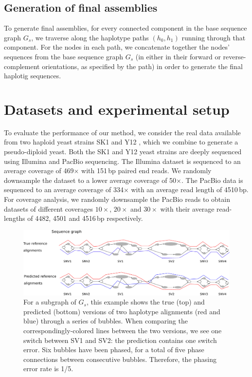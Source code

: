 \subsection{Generation of final assemblies}
To generate final assemblies, for every connected component in the base sequence graph $G_s$, we traverse along the haplotype paths $(h_0,h_1)$ running through that component. For the nodes in each path, we concatenate together the nodes' sequences from the base sequence graph $G_s$ (in either in their forward or reverse-complement orientations, as specified by the path) in order to generate the final haplotig sequences.

\section{Datasets and experimental setup}
To evaluate the performance of our method, we consider the real data available from two haploid yeast strains SK1 and Y12 \citep{yue2017contrasting}, which we combine to generate a pseudo-diploid yeast.
Both the SK1 and Y12 yeast strains are deeply sequenced using Illumina and PacBio sequencing.
The Illumina dataset is sequenced to an average coverage of 469$\times$ with 151\,bp paired end reads. We randomly downsample the dataset to a lower average coverage of 50$\times$.
The PacBio data is sequenced to an average coverage of 334$\times$ with an average read length of 4510\,bp. 
For coverage analysis, we randomly downsample the PacBio reads to obtain datasets of different coverages $10\times$, $20\times$ and $30\times$ with their average read-lengths of 4482, 4501 and 4516\,bp respectively.

\begin{figure}[t!]\centering
\includegraphics[width=\columnwidth]{evaluation.pdf}
\caption{For a subgraph of $G_s$, this example shows the true (top) and predicted (bottom) versions of two haplotype alignments (red and blue) through a series of bubbles. When comparing the correspondingly-colored lines between the two versions, we see one switch between SV1 and SV2: the prediction contains one switch error. 
Six bubbles have been phased, for a total of five phase connections between consecutive bubbles. Therefore, the phasing error rate is 1/5.}
\label{fig:evaluation}
\end{figure}

